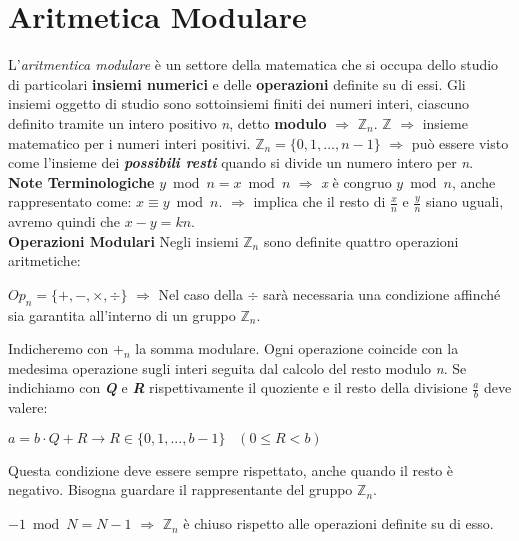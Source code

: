 \chapter{Aritmetica Modulare}
L'\textit{aritmentica modulare} è un settore della matematica che si occupa dello studio di particolari \textbf{insiemi numerici} e delle \textbf{operazioni} definite su di essi. Gli insiemi oggetto di studio sono sottoinsiemi finiti dei numeri interi, ciascuno definito tramite un intero positivo \textit{n}, detto \textbf{modulo} $\Rightarrow$ $\mathbb{Z}_n$. 
\newline
$\mathbb{Z}$ $\Rightarrow$ insieme matematico per i numeri interi positivi.
\newline
$\mathbb{Z}_n = \{0, 1, ..., n-1\}$ $\Rightarrow$ può essere visto come l'insieme dei \textbf{\textit{possibili resti}} quando si divide un numero intero per \textit{n}.
\\ \newline
\textbf{Note Terminologiche}
\newline
$y \bmod n = x \bmod n$ $\Rightarrow$ \textit{x} è congruo $y \bmod n$, anche rappresentato come: $x \equiv y \bmod n$.
\newline
$\Rightarrow$ implica che il resto di $\frac{x}{n}$ e $\frac{y}{n}$ siano uguali, avremo quindi che $x - y = kn$.
\\ \newline
\textbf{Operazioni Modulari}
\newline
Negli insiemi $\mathbb{Z}_n$ sono definite quattro operazioni aritmetiche: 
\begin{center}
    $Op_n = \{+, -, \times, \div\}$ $\Rightarrow$ Nel caso della $\div$ sarà necessaria una condizione affinché sia garantita all'interno di un gruppo $\mathbb{Z}_n$. 
\end{center}
Indicheremo con $+_n$ la somma modulare. Ogni operazione coincide con la medesima operazione sugli interi seguita dal calcolo del resto modulo \textit{n}. Se indichiamo con \textbf{\textit{Q}} e \textbf{\textit{R}} rispettivamente il quoziente e il resto della divisione $\frac{a}{b}$ deve valere:
\begin{center}
    $a = b \cdot Q + R \rightarrow R \in \{0, 1, ..., b - 1\}\;\;\;(0 \le R < b)$
\end{center}
Questa condizione deve essere sempre rispettato, anche quando il resto è negativo. Bisogna guardare il rappresentante del gruppo $\mathbb{Z}_n$.
\begin{center}
    $-1 \bmod N = N -1$ $\Rightarrow$ $\mathbb{Z}_n$ è chiuso rispetto alle operazioni definite su di esso.
\end{center}

